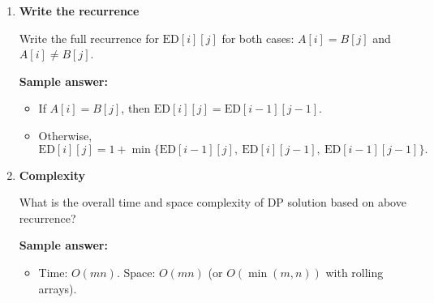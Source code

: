 \documentclass[11pt]{article}
\begin{document}
\begin{enumerate}[leftmargin=0pt, itemindent=1.7em, itemsep=1.2em]
\item \textbf{Write the recurrence}

Write the full recurrence for $\mathrm{ED}[i][j]$ for both cases: $A[i]=B[j]$ and $A[i]\neq B[j]$.

\vspace{3.3cm}

\ifanswers
\textbf{Sample answer:}
\begin{itemize}
    \item If $A[i]=B[j]$, then $\mathrm{ED}[i][j]=\mathrm{ED}[i-1][j-1]$.
    \item Otherwise,
    \[
    \mathrm{ED}[i][j]=1+\min\{\mathrm{ED}[i-1][j],\ \mathrm{ED}[i][j-1],\ \mathrm{ED}[i-1][j-1]\}.
    \]
\end{itemize}
\fi





\item \textbf{Complexity}

What is the overall time and space complexity of DP solution based on above recurrence?

\vspace{1.0cm}

\ifanswers
\textbf{Sample answer:}
\begin{itemize}
    \item Time: $O(mn)$. Space: $O(mn)$ (or $O(\min(m,n))$ with rolling arrays).
\end{itemize}
\fi

\end{enumerate}
\end{document}
